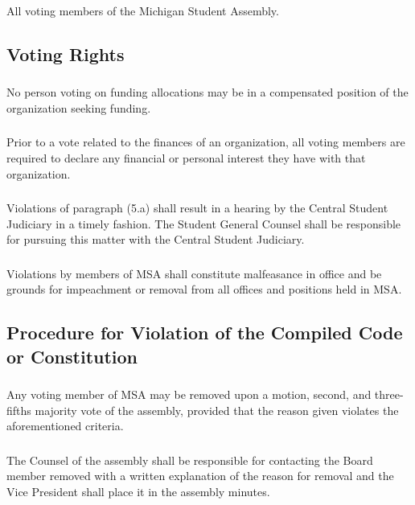 \subsubsection{}
All voting members of the Michigan Student Assembly.


\subsection{Voting Rights}
\subsubsection{}
No person voting on funding allocations may be in a compensated position of the organization seeking funding.
\subsubsection{}
Prior to a vote related to the finances of an organization, all voting members are required to declare any financial or personal interest they have with that organization.
\subsubsection{}
Violations of paragraph (5.a) shall result in a hearing by the Central Student Judiciary in a timely fashion.
\subsubsubsection{}
The Student General Counsel shall be responsible for pursuing this matter with the Central Student Judiciary.
\subsubsection{}
Violations by members of MSA shall constitute malfeasance in office and be grounds for impeachment or removal from all offices and positions held in MSA.


\subsection{Procedure for Violation of the Compiled Code or Constitution}
\subsubsection{}
Any voting member of MSA may be removed upon a motion, second, and three-fifths majority vote of the assembly, provided that the reason given violates the aforementioned criteria.
\subsubsection{}
The Counsel of the assembly shall be responsible for contacting the Board member removed with a written explanation of the reason for removal and the Vice President shall place it in the assembly minutes.



